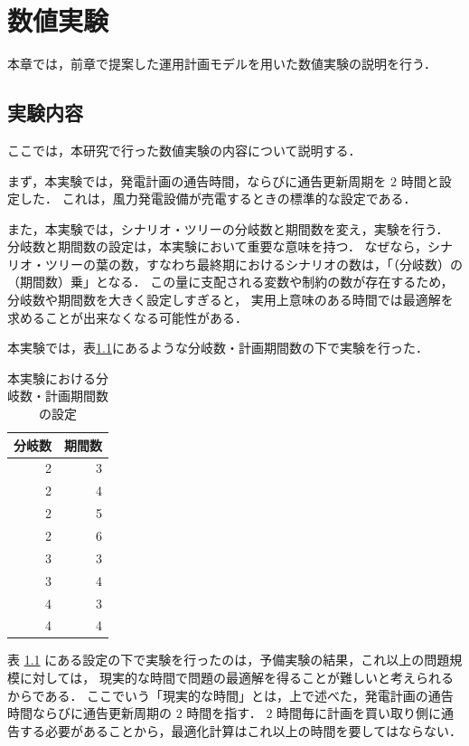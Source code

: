 \documentclass[a4paper,12pt,showkeys]{jreport}
\begin{document}
\chapter{数値実験}

本章では，前章で提案した運用計画モデルを用いた数値実験の説明を行う．

\section{実験内容}

ここでは，本研究で行った数値実験の内容について説明する．

まず，本実験では，発電計画の通告時間，ならびに通告更新周期を $2$ 時間と設定した．
これは，風力発電設備が売電するときの標準的な設定である\cite{電力}．

また，本実験では，シナリオ・ツリーの分岐数と期間数を変え，実験を行う．
分岐数と期間数の設定は，本実験において重要な意味を持つ．
なぜなら，シナリオ・ツリーの葉の数，すなわち最終期におけるシナリオの数は，「（分岐数）の（期間数）乗」となる．
この量に支配される変数や制約の数が存在するため，分岐数や期間数を大きく設定しすぎると，
実用上意味のある時間では最適解を求めることが出来なくなる可能性がある．

本実験では，表\ref{tb:1}にあるような分岐数・計画期間数の下で実験を行った．
%
\begin{table}[h]
\begin{center}
  \caption{本実験における分岐数・計画期間数の設定}
  \label{tb:1}
  \begin{tabular}{|r|r|}
  \hline
  分岐数 & 期間数 \\
  \hline
  \hline
  2 & 3 \\
  \hline
  2 & 4 \\
  \hline
  2 & 5 \\
  \hline
  2 & 6 \\
  \hline
  3 & 3 \\
  \hline
  3 & 4 \\
  \hline
  4 & 3 \\
  \hline
  4 & 4 \\
  \hline
  \end{tabular}
\end{center}
\end{table}
%

表 \ref{tb:1} にある設定の下で実験を行ったのは，予備実験の結果，これ以上の問題規模に対しては，
現実的な時間で問題の最適解を得ることが難しいと考えられるからである．
ここでいう「現実的な時間」とは，上で述べた，発電計画の通告時間ならびに通告更新周期の $2$ 時間を指す．
$2$ 時間毎に計画を買い取り側に通告する必要があることから，最適化計算はこれ以上の時間を要してはならない．
\end{document}
